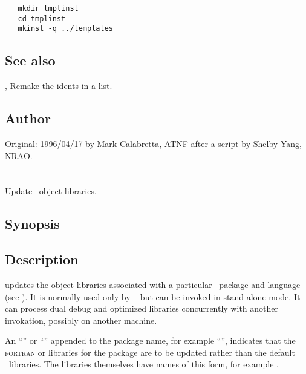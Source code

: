 \begin{verbatim}
   mkdir tmplinst
   cd tmplinst
   mkinst -q ../templates
\end{verbatim}
 
\subsection*{See also}
 
, Remake the idents in a  list.
 
\subsection*{Author}
 
Original: 1996/04/17 by Mark Calabretta, ATNF after a  script by
Shelby Yang, NRAO.
 

\newpage
\section{}
\label{updatelib}



Update \aipspp\ object libraries.

\subsection*{Synopsis}

\begin{synopsis}
\end{synopsis}

\subsection*{Description}

 updates the object libraries associated with a particular
\aipspp\ package and language (see ).  It is normally used only
by \aipspp\  but can be invoked in stand-alone mode.  It can
process dual debug and optimized libraries concurrently with another
invokation, possibly on another machine.

An ``'' or ``'' appended to the package name, for example
``'', indicates that the \textsc{fortran} or 
libraries for the package are to be updated rather than the default
\cplusplus\ libraries.  The libraries themselves have names of this form, for
example .

